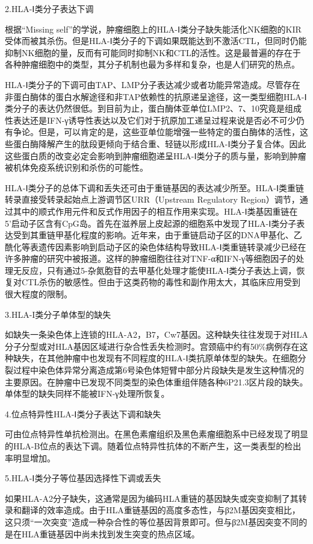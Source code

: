 2.HLA-Ⅰ类分子表达下调

根据“Missing
self”的学说，肿瘤细胞上的HLA-Ⅰ类分子缺失能活化NK细胞的KIR受体而被其杀伤。但是HLA-Ⅰ类分子的下调如果既能达到不激活CTL，但同时仍能抑制NK细胞的量，反而有可能同时抑制NK和CTL的活性。这是最普遍的存在于各种肿瘤细胞中的类型，其分子机制也最为多样和复杂，也是人们研究的热点。

HLA-Ⅰ类分子的下调可由TAP、LMP分子表达减少或者功能异常造成。尽管存在非蛋白酶体的蛋白水解途径和非TAP依赖性的抗原递呈途径，这一类型细胞HLA-Ⅰ类分子的表达仍然很低。到目前为止，蛋白酶体亚单位LMP2、7、10究竟是组成性表达还是IFN-γ诱导性表达以及它们对于抗原加工递呈过程来说是否必不可少仍有争论。但是，可以肯定的是，这些亚单位能增强一些特定的蛋白酶体的活性，这些蛋白酶降解产生的肽段更倾向于结合重、轻链以形成HLA-Ⅰ类分子复合体。因此这些蛋白质的改变必定会影响到肿瘤细胞递呈HLA-Ⅰ类分子的质与量，影响到肿瘤被机体免疫系统识别和杀伤的可能性。

HLA-Ⅰ类分子的总体下调和丢失还可由于重链基因的表达减少所至。HLA-Ⅰ类重链转录直接受转录起始点上游调节区URR（Upstream
Regulatory
Region）调节，通过其中的顺式作用元件和反式作用因子的相互作用来实现。HLA-Ⅰ类基因重链在5'启动子区含有CpG岛。首先在滋养层上皮起源的细胞系中发现了HLA-Ⅰ类分子表达受到其重链甲基化程度的影响。近年来，由于重链启动子区的DNA甲基化、乙酰化等表遗传因素影响到启动子区的染色体结构导致HLA-Ⅰ类重链转录减少已经在许多肿瘤的研究中被报道。这样的肿瘤细胞往往对TNF-α和IFN-γ等细胞因子的处理无反应，只有通过5-杂氮胞苷的去甲基化处理才能使HLA-Ⅰ类分子表达上调，恢复对CTL杀伤的敏感性。但由于这类药物的毒性和副作用太大，其临床应用受到很大程度的限制。

3.HLA-I类分子单体型的缺失

如缺失一条染色体上连锁的HLA-A2，B7，Cw7基因。这种缺失往往发现于对HLA分子分型或对HLA基因区域进行杂合性丢失检测时。宫颈癌中约有50\%病例存在这种缺失，在其他肿瘤中也发现有不同程度的HLA-Ⅰ类抗原单体型的缺失。在细胞分裂过程中染色体异常分离造成第6号染色体短臂中部分片段缺失是发生这种情况的主要原因。在肿瘤中已发现不同类型的染色体重组伴随各种6P21.3区片段的缺失。单体型的缺失同样不能被IFN-γ处理所恢复。

4.位点特异性HLA-Ⅰ类分子表达下调和缺失

可由位点特异性单抗检测出。在黑色素瘤组织及黑色素瘤细胞系中已经发现了明显的HLA-B位点的表达下调。随着位点特异性抗体的不断产生，这一类表型的检出率明显增加。

5.HLA-Ⅰ类分子等位基因选择性下调或丢失

如果HLA-A2分子缺失，这通常是因为编码HLA重链的基因缺失或突变抑制了其转录和翻译的效率造成。由于HLA重链基因的高度多态性，与β2M基因突变相比，这只须“一次突变”造成一种杂合性的等位基因背景即可。但与β2M基因突变不同的是在HLA重链基因中尚未找到发生突变的热点区域。

